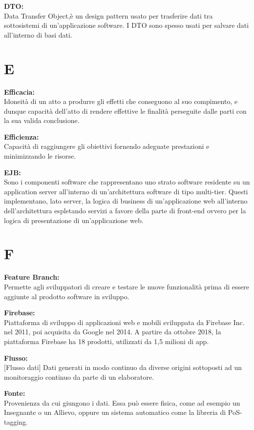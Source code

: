 \documentclass[a4paper, oneside, openany, dvipsnames, table]{article}
\begin{document}
\textbf{DTO:}\\
Data Transfer Object,è  un design pattern usato per trasferire dati tra sottosistemi di un'applicazione software. I DTO sono spesso usati per salvare dati all'interno di basi dati.


\newpage
\section{E}
\textbf{Efficacia:}\\	Idoneità di un atto a produrre gli effetti che conseguono al suo compimento, e dunque capacità dell'atto di rendere effettive le finalità perseguite dalle parti con la sua valida conclusione. 

\textbf{Efficienza:}\\ Capacità di raggiungere gli obiettivi fornendo adeguate prestazioni e minimizzando le risorse.

\textbf{EJB:}\\	Sono i componenti software che rappresentano uno strato software residente su un application server all'interno di un'architettura software di tipo multi-tier. Questi implementano, lato server, la logica di business di un'applicazione web all'interno dell'architettura espletando servizi a favore della parte di front-end ovvero per la logica di presentazione di un'applicazione web.

\newpage
\section{F}
\textbf{Feature Branch:}\\	Permette agli sviluppatori di creare e testare le nuove funzionalità  prima di essere aggiunte al prodotto software in sviluppo.

\textbf{Firebase:}\\	Piattaforma di sviluppo di applicazioni web e mobili sviluppata da Firebase Inc. nel 2011, poi acquisita da Google nel 2014. A partire da ottobre 2018, la piattaforma Firebase ha 18 prodotti, utilizzati da 1,5 milioni di app.

\textbf{Flusso:}\\	{[}Flusso dati{]} Dati generati in modo continuo da diverse origini sottoposti ad un monitoraggio continuo da parte di un elaboratore.

\textbf{Fonte:}\\	Provenienza da cui giungono i dati. Essa può essere fisica, come ad esempio un Insegnante o un Allievo, oppure un sistema automatico come la libreria di PoS-tagging.
\end{document}
